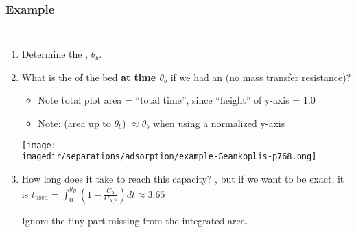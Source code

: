 \begin{frame}\frametitle{Example}
	\vspace{-12pt}
	\begin{columns}[t]
		\begin{enumerate}
			\item	Determine the {\color{purple}{breakthrough time}}, $\theta_b$. \pause \iftoggle{instructor}{[{\color{myOrange}{\small Ans: 3.65 hours}}]}{}		
			\item	What is the {\color{purple}{usable capacity}} of the bed \textbf{at time $\theta_b$} if we had an {\color{purple}{ideal wavefront}} (no mass transfer resistance)? \pause \iftoggle{instructor}{[{\color{myOrange}{Ans:}} the fractional area of $A_1$ = 3.65 / 6.9 = {\color{orange}{53\%}}]}{}
			\pause
				\begin{itemize}
					\item	Note total plot area = ``total time'', since ``height'' of y-axis = 1.0
					\item	Note: (area up to $\theta_b$) $\approx \theta_b$  when using a normalized y-axis
				\end{itemize}
			\begin{center}
				\texttt{[image: \\imagedir/separations/adsorption/example-Geankoplis-p768.png]}
			\end{center}
			\vspace{-6pt}
			\item	How long does it take to reach this capacity? {}, but if we want to be exact, it is $t_\text{used} = \displaystyle \int_0^{\theta_B}{\left(1-\frac{C_\text{A}}{C_\text{A,F}} \right)dt} \approx 3.65$
			
			\vspace{-4pt}
			{\tiny Ignore the tiny part missing from the integrated area.}
		\end{enumerate}
	\end{columns}	
\end{frame}

